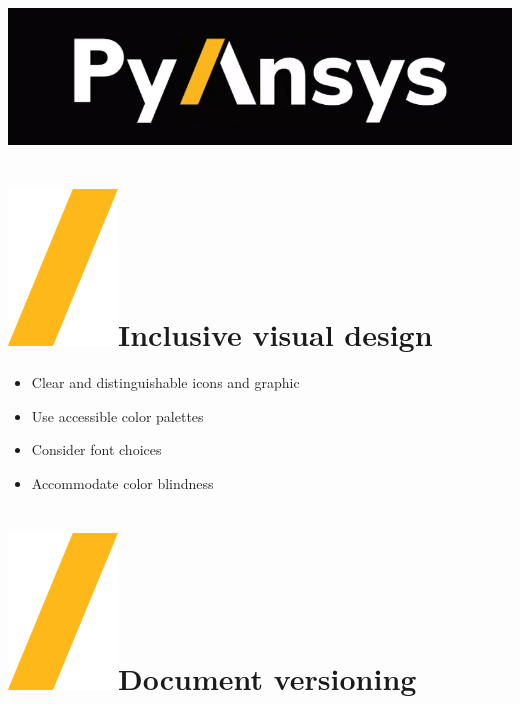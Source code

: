 \documentclass[a0paper,fleqn]{src/betterposter}
\begin{document}
{%
\vfill

\includegraphics[width=\textwidth]{img/general/pyansys_dark}\\

}{

\section{\includegraphics[height=\fontcharht\font`\S]{img/general/slash.png}Inclusive visual design}

\begin{itemize}
\item Clear and distinguishable icons and graphic
\item Use accessible color palettes
\item Consider font choices
\item Accommodate color blindness
\end{itemize}

\section{\includegraphics[height=\fontcharht\font`\S]{img/general/slash.png}Document versioning}

}
\end{document}
